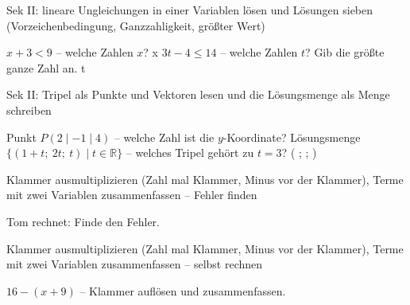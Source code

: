 \begin{aufgabe}{Sek II: lineare Ungleichungen in einer Variablen lösen und Lösungen sieben (Vorzeichenbedingung, Ganzzahligkeit, größter Wert)}
\begin{teile}
\teil $x + 3 < 9$ – welche Zahlen $x$? x \leerfeld
\teil $3t - 4 \le 14$ – welche Zahlen $t$? Gib die größte ganze Zahl an. t \leerfeld
\end{teile}
\end{aufgabe}

\begin{aufgabe}{Sek II: Tripel als Punkte und Vektoren lesen und die Lösungsmenge als Menge schreiben}
\begin{teile}
\teil Punkt $P(2 \mid -1 \mid 4)$ – welche Zahl ist die $y$-Koordinate? \leerfeld
\teil Lösungsmenge $\{(1 + t;\ 2t;\ t) \mid t \in \mathbb{R}\}$ – welches Tripel gehört zu $t = 3$? ( \leerfeld ; \leerfeld ; \leerfeld )
\end{teile}
\end{aufgabe}

\begin{aufgabe}{Klammer ausmultiplizieren (Zahl mal Klammer, Minus vor der Klammer), Terme mit zwei Variablen zusammenfassen – Fehler finden}
\begin{teile}
\teil Tom rechnet:  Finde den Fehler.
\end{teile}
\end{aufgabe}

\begin{aufgabe}{Klammer ausmultiplizieren (Zahl mal Klammer, Minus vor der Klammer), Terme mit zwei Variablen zusammenfassen – selbst rechnen}
\begin{teile}
\teil $16 - (x + 9)$ – Klammer auflösen und zusammenfassen. \leerfeld
\end{teile}
\end{aufgabe}
